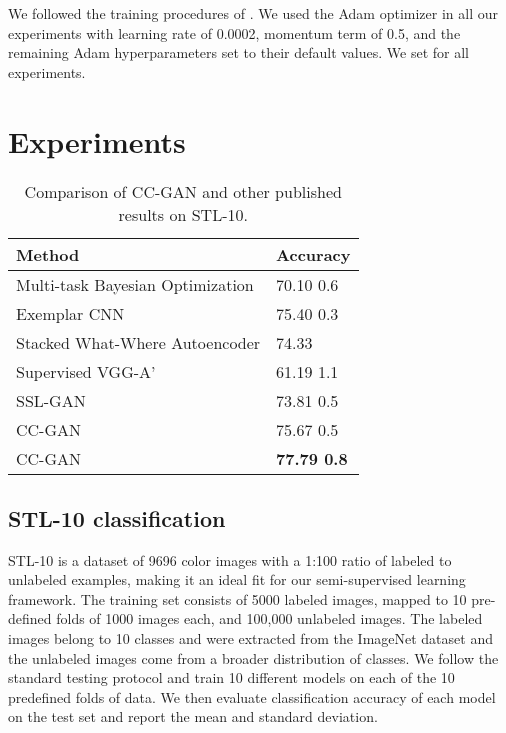 \documentclass{article} \usepackage{iclr2017_conference,times}
\begin{document}
We followed the training procedures of \cite{radford2016}.
We used the Adam optimizer \citep{kingma2015} in all our experiments with learning rate of 0.0002, momentum term  of 0.5, and the remaining Adam hyperparameters set to their default values.
We set  for all experiments. 
 
\vspace{1em}
\section{Experiments}

\begin{table}[!t]
\centering
\small
\begin{tabularx}{0.7\textwidth}{l|l}
\bf{Method} & \bf{Accuracy}\\
\hline
\hline
Multi-task Bayesian Optimization \citep{swersky2013} & 70.10  0.6 \\
Exemplar CNN \citep{dosovitskiy2014b} & 75.40  0.3 \\
Stacked What-Where Autoencoder \citep{zhao2016}& 74.33 \\
\hline
Supervised VGG-A'  & 61.19  1.1\\
SSL-GAN  & 73.81  0.5\\
CC-GAN& 75.67  0.5 \\
CC-GAN& \bf{77.79}  0.8 \\
\end{tabularx}
\vspace{2mm}
\caption{Comparison of CC-GAN and other published results on STL-10.}
\label{tab:stl}
\end{table}


\subsection{STL-10 classification}


STL-10 is a dataset of 9696 color images with a 1:100 ratio of labeled to unlabeled examples, making it an ideal fit for our semi-supervised learning framework. 
The training set consists of 5000 labeled images, mapped to 10 pre-defined folds of 1000 images each, and 100,000 unlabeled images.
The labeled images belong to 10 classes and were extracted from the ImageNet dataset and the unlabeled images come from a broader distribution of classes. 
We follow the standard testing protocol and train 10 different models on each of the 10 predefined folds of data. 
We then evaluate classification accuracy of each model on the test set and report the mean and standard deviation. 
\end{document}
